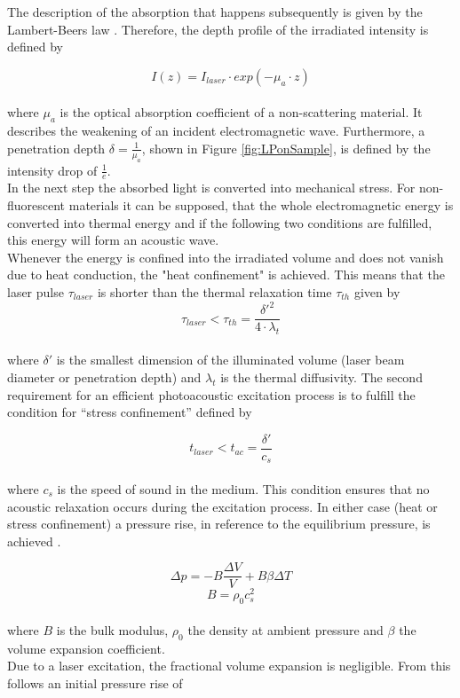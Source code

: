 The description of the absorption that happens subsequently is given by the Lambert-Beers law \cite{demtroder:ExPhysik}. Therefore, the depth profile of the irradiated intensity is defined by

 \begin{equation}
 	I(z) = I_{laser}  \cdot exp(-\mu_a \cdot z)
 	\label{eq:lambertbeer}
 \end{equation}
\\
where $\mu_a$ is the optical absorption coefficient of a non-scattering material. It describes the weakening of an incident electromagnetic wave. Furthermore, a penetration depth $\delta = \frac{1}{\mu_a}$, shown in Figure \ref{fig:LPonSample}, is defined by the intensity drop of $\frac{1}{e}$.\\
In the next step the absorbed light is converted into mechanical stress. For non-fluorescent materials it can be supposed, that the whole electromagnetic energy is converted into thermal energy and if the following two conditions are fulfilled, this energy will form an acoustic wave.\\
Whenever the energy is confined into the irradiated volume and does not vanish due to heat conduction, the "heat confinement" is achieved. This means that the laser pulse $\tau_{laser}$ is shorter than the thermal relaxation time $\tau_{th}$
given by
\begin{equation}
	\tau_{laser} < \tau_{th} = \frac{\delta'^2}{4\cdot\lambda_t} 
	\label{eq:thConf}
\end{equation}
\\
where $\delta'$ is the smallest dimension of the illuminated volume (laser beam diameter or penetration depth) and $\lambda_t$ is the thermal diffusivity. \newline
The second requirement for an efficient photoacoustic excitation process is to fulfill the condition for “stress confinement” defined by

\begin{equation}
t_{laser} < t_{ac} = \frac{\delta'}{c_s} 
\label{eq:stressConf}
\end{equation}
\\
where $c_s$ is the speed of sound in the medium. This condition ensures that no acoustic relaxation occurs during the excitation process. In either case (heat or stress confinement) a pressure rise, in reference to the equilibrium pressure, is achieved \cite{GrattSibylle:Dis}. 

\begin{equation}
\Delta p = - B \frac{\Delta V}{V}  + B \beta \Delta T
\label{eq:dV/V}
\end{equation}
\begin{equation}
B = \rho_0 c_s^2
\end{equation}
\\
where $B$ is the bulk modulus, $\rho_0$ the density at ambient pressure and $\beta$ the volume expansion coefficient. \\
Due to a laser excitation, the fractional volume expansion is negligible. From this follows an initial pressure rise of

